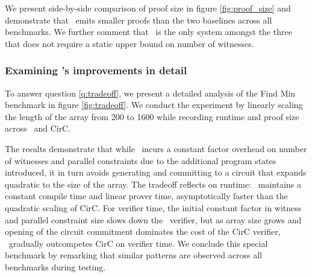 We present side-by-side comparison of proof size in figure \ref{fig:proof_size} and demonstrate that \CoBBl~emits smaller proofs than the two baselines across all benchmarks.  We further comment that \CoBBl~is the only system amongst the three that does not require a static upper bound on number of witnesses. 

\subsubsection{Examining \CoBBl's improvements in detail}


To answer question \ref{q:tradeoff}, we present a detailed analysis of the Find Min benchmark in figure \ref{fig:tradeoff}. We conduct the experiment by linearly scaling the length of the array from 200 to 1600 while recording runtime and proof size across \CoBBl~and CirC.

The results demonstrate that while \CoBBl~incurs a constant factor overhead on number of witnesses and parallel constraints due to the additional program states introduced, it in turn avoids generating and committing to a circuit that expands quadratic to the size of the array. The tradeoff reflects on runtime: \CoBBl~maintains a constant compile time and linear prover time, asymptotically faster than the quadratic scaling of CirC. For verifier time, the initial constant factor in witness and parallel constraint size slows down the \CoBBl~verifier, but as array size grows and opening of the circuit commitment dominates the cost of the CirC verifier, \CoBBl~gradually outcompetes CirC on verifier time. We conclude this special benchmark by remarking that similar patterns are observed across all benchmarks during testing.